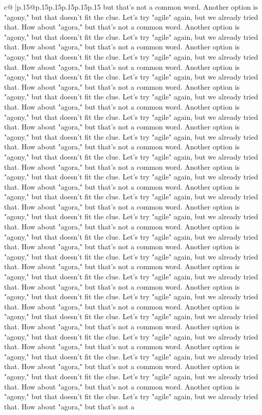 \documentclass{article}
\begin{document}
{\begin{supertabular}{c@{$\;$}|p{.15\linewidth}@{}p{.15\linewidth}p{.15\linewidth}p{.15\linewidth}p{.15\linewidth}p{.15\linewidth}}
{{{but that's not a common word. Another option is "agony," but that doesn't fit the clue. Let's try "agile" again, but we already tried that. How about "agora," but that's not a common word. Another option is "agony," but that doesn't fit the clue. Let's try "agile" again, but we already tried that. How about "agora," but that's not a common word. Another option is "agony," but that doesn't fit the clue. Let's try "agile" again, but we already tried that. How about "agora," but that's not a common word. Another option is "agony," but that doesn't fit the clue. Let's try "agile" again, but we already tried that. How about "agora," but that's not a common word. Another option is "agony," but that doesn't fit the clue. Let's try "agile" again, but we already tried that. How about "agora," but that's not a common word. Another option is "agony," but that doesn't fit the clue. Let's try "agile" again, but we already tried that. How about "agora," but that's not a common word. Another option is "agony," but that doesn't fit the clue. Let's try "agile" again, but we already tried that. How about "agora," but that's not a common word. Another option is "agony," but that doesn't fit the clue. Let's try "agile" again, but we already tried that. How about "agora," but that's not a common word. Another option is "agony," but that doesn't fit the clue. Let's try "agile" again, but we already tried that. How about "agora," but that's not a common word. Another option is "agony," but that doesn't fit the clue. Let's try "agile" again, but we already tried that. How about "agora," but that's not a common word. Another option is "agony," but that doesn't fit the clue. Let's try "agile" again, but we already tried that. How about "agora," but that's not a common word. Another option is "agony," but that doesn't fit the clue. Let's try "agile" again, but we already tried that. How about "agora," but that's not a common word. Another option is "agony," but that doesn't fit the clue. Let's try "agile" again, but we already tried that. How about "agora," but that's not a common word. Another option is "agony," but that doesn't fit the clue. Let's try "agile" again, but we already tried that. How about "agora," but that's not a common word. Another option is "agony," but that doesn't fit the clue. Let's try "agile" again, but we already tried that. How about "agora," but that's not a common word. Another option is "agony," but that doesn't fit the clue. Let's try "agile" again, but we already tried that. How about "agora," but that's not a common word. Another option is "agony," but that doesn't fit the clue. Let's try "agile" again, but we already tried that. How about "agora," but that's not a common word. Another option is "agony," but that doesn't fit the clue. Let's try "agile" again, but we already tried that. How about "agora," but that's not a common word. Another option is "agony," but that doesn't fit the clue. Let's try "agile" again, but we already tried that. How about "agora," but that's not a common word. Another option is "agony," but that doesn't fit the clue. Let's try "agile" again, but we already tried that. How about "agora," but that's not a }}}
\end{supertabular}}
\end{document}
